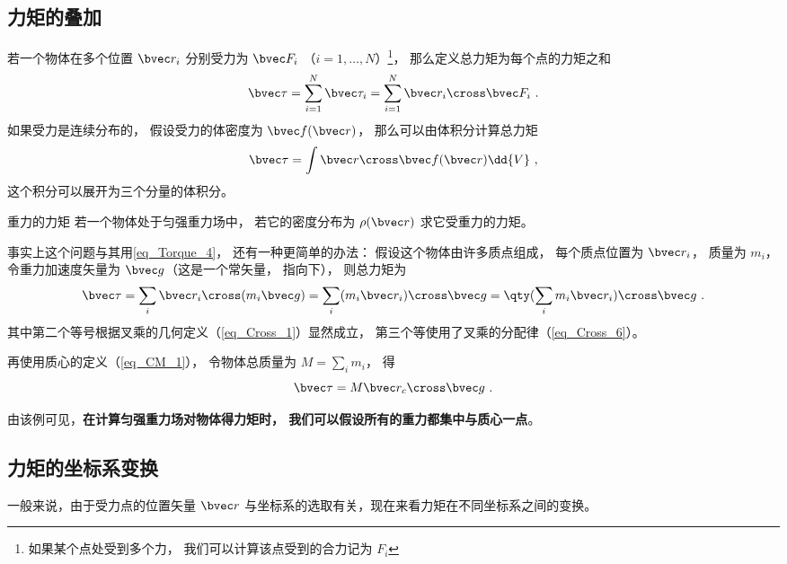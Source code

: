 \subsection{力矩的叠加}

若一个物体在多个位置 $\bvec r_i$ 分别受力为 $\bvec F_i$ （$i = 1, \dots, N$）\footnote{如果某个点处受到多个力， 我们可以计算该点受到的合力记为 $F_i$}， 那么定义总力矩为每个点的力矩之和
\begin{equation}
\bvec \tau = \sum_{i=1}^N \bvec \tau_i = \sum_{i=1}^N \bvec r_i \cross \bvec F_i~.
\end{equation}
如果受力是连续分布的， 假设受力的体密度为 $\bvec f(\bvec r)$， 那么可以由体积分计算总力矩
\begin{equation}\label{eq_Torque_4}
\bvec \tau = \int \bvec r \cross \bvec f(\bvec r) \dd{V}~,
\end{equation}
这个积分可以展开为三个分量的体积分。

\begin{example}{重力的力矩}\label{ex_Torque_1}
若一个物体处于匀强重力场中， 若它的密度分布为 $\rho(\bvec r)$ 求它受重力的力矩。

事实上这个问题与其用\autoref{eq_Torque_4}， 还有一种更简单的办法： 假设这个物体由许多质点组成， 每个质点位置为 $\bvec r_i$， 质量为 $m_i$， 令重力加速度矢量为 $\bvec g$（这是一个常矢量， 指向下）， 则总力矩为
\begin{equation}
\bvec \tau = \sum_i \bvec r_i \cross (m_i \bvec g) = \sum_i (m_i \bvec r_i) \cross \bvec g = \qty(\sum_i m_i \bvec r_i) \cross \bvec g~.
\end{equation}
其中第二个等号根据叉乘的几何定义（\autoref{eq_Cross_1}）显然成立， 第三个等使用了叉乘的分配律（\autoref{eq_Cross_6}）。


再使用质心的定义（\autoref{eq_CM_1}）， 令物体总质量为 $M = \sum_i m_i$， 得
\begin{equation}
\bvec \tau = M \bvec r_c \cross \bvec g~.
\end{equation}
\end{example}
由该例可见，\textbf{在计算匀强重力场对物体得力矩时， 我们可以假设所有的重力都集中与质心一点}。

\subsection{力矩的坐标系变换}\label{sub_Torque_1}
一般来说，由于受力点的位置矢量 $\bvec r$ 与坐标系的选取有关，现在来看力矩在不同坐标系之间的变换。

